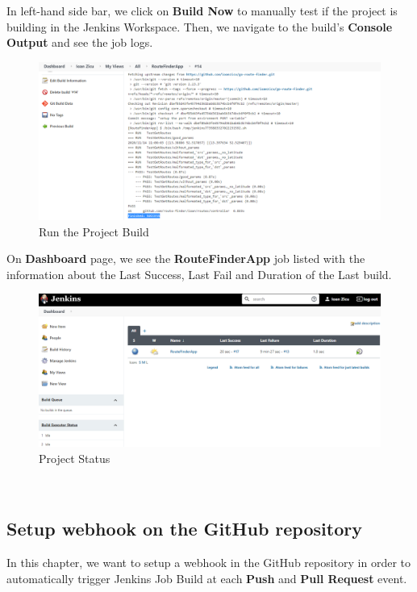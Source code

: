 \documentclass[12pt,a4paper,twoside]{article}
\begin{document}
In left-hand side bar, we click on \textbf{Build Now} to manually test if the project is building in the Jenkins Workspace. Then, we navigate to the build's \textbf{Console Output} and see the job logs.


\begin{figure}[H]
    \centering
        \includegraphics[width=15cm]{images-aws/38-test-build.png}
        \caption{Run the Project Build}
\end{figure}


On \textbf{Dashboard} page, we see the \textbf{RouteFinderApp} job listed with the information about the Last Success, Last Fail and Duration of the Last build.


\begin{figure}[H]
    \centering
        \includegraphics[width=15cm]{images-aws/39-test-build-success.png}
        \caption{Project Status}
\end{figure}



~\newpage


\subsection{Setup webhook on the GitHub repository}


In this chapter, we want to setup a webhook in the GitHub repository in order to automatically trigger Jenkins Job Build at each \textbf{Push} and \textbf{Pull Request} event. 
\end{document}
